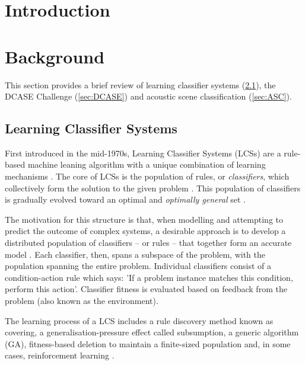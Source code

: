 \documentclass[11pt]{article}
\begin{document}
\begin{multicols}{2}


\section{Introduction}


\lipsum[1]




\section{Background}

This section provides a brief review of learning classifier systems (\ref{sec:LCS}), the DCASE Challenge (\ref{sec:DCASE}) and acoustic scene classification (\ref{sec:ASC}).



\subsection{Learning Classifier Systems}
\label{sec:LCS}

First introduced in the mid-1970s, Learning Classifier Systems (LCSs) are a rule-based machine leaning algorithm with a unique combination of learning mechanisms \cite{Butz2015}. The core of LCSs is the population of rules, or \textit{classifiers}, which collectively form the solution to the given problem \cite{Urbanowicz2009}. This population of classifiers is gradually evolved toward an optimal and \textit{optimally general} set \cite{Urbanowicz2009}.

The motivation for this structure is that, when modelling and attempting to predict the outcome of complex systems, a desirable approach is to develop a distributed population of classifiers -- or rules -- that together form an accurate model \cite[p.~2]{Urbanowicz2009}. Each classifier, then, spans a subspace of the problem, with the population spanning the entire problem. Individual classifiers consist of a condition-action rule which says: 'If a problem instance matches this condition, perform this action'. Classifier fitness is evaluated based on feedback from the problem (also known as the environment).

The learning process of a LCS includes a rule discovery method known as covering, a generalisation-pressure effect called subsumption, a generic algorithm (GA), fitness-based deletion to maintain a finite-sized population and, in some cases, reinforcement learning \cite{Butz2000}.


\end{multicols}
\end{document}
